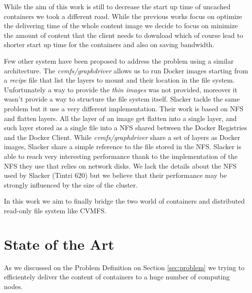 While the aim of this work is still to decrease the start up time of uncached
containers we took a different road. While the previous works focus on optimize
the delivering time of the whole content image we decide to focus on minimize
the amount of content that the client needs to download which of course lead to
shorter start up time for the containers and also on saving bandwidth.

Few other system have been proposed to address the problem using a similar
architecture. The \textit{cvmfs/graphdriver} \cite{graphdriver-plugin} allows
us to run Docker images starting from a \textit{recipe} file that  list the
layers to mount and their location in the file system. Unfortunately a way to
provide the \textit{thin images} was not provided, moreover it wasn't provide a
way to structure the file system itself. Slacker \cite{slacker} tackle the same
problem but it use a very different implementation. Their work is based on NFS
and flatten layers. All the layer of an image get flatten into a single layer,
and such layer stored as a single file into a NFS shared between the Docker
Registries and the Docker Client. While \textit{cvmfs/graphdriver} share a set
of layers as Docker images, Slacker share a simple reference to the file stored
in the NFS. Slacker is able to reach very interesting performance thank to the
implementation of the NFS they use that relies on network disks. We lack the
details about the NFS used by Slacker (Tintri 620) but we believe that their
performance may be strongly influenced by the size of the cluster.

In this work we aim to finally bridge the two world of containers and
distributed read-only file system like CVMFS.

\chapter{State of the Art }\label{ch:SoA}


As we discussed on the Problem Definition on Section \ref{sec:problem} we
trying to efficientely deliver the content of containers to a huge number of
computing nodes.

